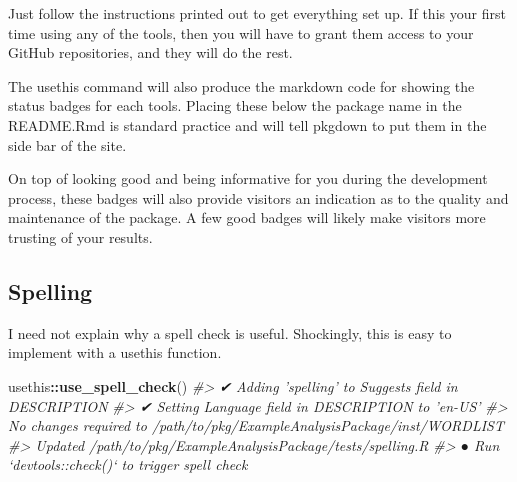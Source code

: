 \documentclass[]{book}
\newenvironment{Shaded}{\begin{snugshade}}{\end{snugshade}}
\newcommand{\CommentTok}[1]{\textcolor[rgb]{0.56,0.35,0.01}{\textit{#1}}}
\newcommand{\KeywordTok}[1]{\textcolor[rgb]{0.13,0.29,0.53}{\textbf{#1}}}
\newcommand{\NormalTok}[1]{#1}
\newcommand{\OperatorTok}[1]{\textcolor[rgb]{0.81,0.36,0.00}{\textbf{#1}}}
\newcommand{\StringTok}[1]{\textcolor[rgb]{0.31,0.60,0.02}{#1}}
\begin{document}
\begin{Shaded}
\end{Shaded}

Just follow the instructions printed out to get everything set up. If this your first time using any of the tools, then you will have to grant them access to your GitHub repositories, and they will do the rest.

The usethis command will also produce the markdown code for showing the status badges for each tools. Placing these below the package name in the README.Rmd is standard practice and will tell pkgdown to put them in the side bar of the site.

On top of looking good and being informative for you during the development process, these badges will also provide visitors an indication as to the quality and maintenance of the package. A few good badges will likely make visitors more trusting of your results.

\hypertarget{spelling}{%
\subsection{Spelling}\label{spelling}}

I need not explain why a spell check is useful. Shockingly, this is easy to implement with a usethis function.

\begin{Shaded}
\begin{Highlighting}[]
\NormalTok{usethis}\OperatorTok{::}\KeywordTok{use_spell_check}\NormalTok{()}
\CommentTok{#> ✔ Adding 'spelling' to Suggests field in DESCRIPTION}
\CommentTok{#> ✔ Setting Language field in DESCRIPTION to 'en-US'}
\CommentTok{#> No changes required to /path/to/pkg/ExampleAnalysisPackage/inst/WORDLIST}
\CommentTok{#> Updated /path/to/pkg/ExampleAnalysisPackage/tests/spelling.R}
\CommentTok{#> ● Run `devtools::check()` to trigger spell check}
\end{Highlighting}
\end{Shaded}
\end{document}
